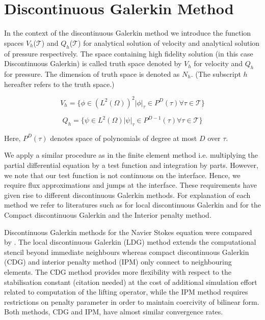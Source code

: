 \documentclass[a4paper,12pt]{book}
\begin{document}
\section{Discontinuous Galerkin Method}

In the context of the discontinuous Galerkin method we introduce the function spaces $V_h$($\mathcal{T}$) and $Q_h$($\mathcal{T}$) for analytical solution of velocity and analytical solution of pressure respectively. The space containing high fidelity solution (in this case Discontinuous Galerkin) is called truth space denoted by $V_h$ for velocity and $Q_h$ for pressure. The dimension of truth space is denoted as $N_h$. (The subscript $h$ hereafter refers to the truth space.)

\begin{equation} \label{velocity_test}
V_h = \lbrace \phi \in (L^2(\Omega))^2| \phi |_\tau \in P^D(\tau) \forall \tau \in \mathcal{T} \rbrace
\end{equation}

\begin{equation} \label{pressure_test}
Q_h = \lbrace \psi \in L^2(\Omega)| \psi |_\tau \in P^{D-1}(\tau) \forall \tau \in \mathcal{T} \rbrace
\end{equation}

Here, $P^D(\tau)$ denotes space of polynomials of degree at most $D$ over $\tau$.

We apply a similar procedure as in the finite element method i.e. multiplying the partial differential equation by a test function and integration by parts. However, we note that our test function is not continuous on the interface. Hence, we require flux approximations and jumps at the interface. These requirements have given rise to different discontinuous Galerkin methods. For explanation of each method we refer to literatures such as \cite{persson} for local discontinuous Galerkin and \cite{Montlaur} for the Compact discontinuous Galerkin and the Interior penalty method. 

Discontinuous Galerkin methods for the Navier Stokes equation were compared by \cite{Montlaur}. The local discontinuous Galerkin (LDG) method extends the computational stencil beyond immediate neighbours whereas compact discontinuous Galerkin (CDG) and interior penalty method (IPM) only connect to neighbouring elements. The CDG method provides more flexibility with respect to the stabilisation constant (citation needed) at the cost of additional simulation effort related to computation of the lifting operator, while the IPM method requires restrictions on penalty parameter in order to maintain coercivity of bilinear form. Both methods, CDG and IPM, have almost similar convergence rates. 
\end{document}
